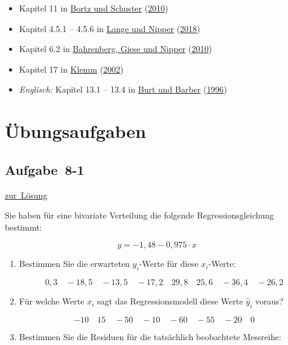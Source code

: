 \documentclass[
  11pt,
  ngerman,
  a4paper,
]{report}
\providecommand{\tightlist}{%
  \setlength{\itemsep}{0pt}\setlength{\parskip}{0pt}}
\begin{document}
\begin{itemize}
\tightlist
\item
  Kapitel 11 in \protect\hyperlink{ref-bortz}{Bortz und Schuster} (\protect\hyperlink{ref-bortz}{2010})
\item
  Kapitel 4.5.1 -- 4.5.6 in \protect\hyperlink{ref-delange}{Lange und Nipper} (\protect\hyperlink{ref-delange}{2018})
\item
  Kapitel 6.2 in \protect\hyperlink{ref-bahrenberg}{Bahrenberg, Giese und Nipper} (\protect\hyperlink{ref-bahrenberg}{2010})
\item
  Kapitel 17 in \protect\hyperlink{ref-klemm}{Klemm} (\protect\hyperlink{ref-klemm}{2002})
\item
  \emph{Englisch:} Kapitel 13.1 -- 13.4 in \protect\hyperlink{ref-burt}{Burt und Barber} (\protect\hyperlink{ref-burt}{1996})
\end{itemize}

\hypertarget{uxfcbungsaufgaben-7}{%
\section*{Übungsaufgaben}\label{uxfcbungsaufgaben-7}}

\hypertarget{aufgabe-8-1}{%
\subsection{Aufgabe~8-1}\label{aufgabe-8-1}}

\protect\hyperlink{loesung-8-1}{zur~Lösung}

Sie haben für eine bivariate Verteilung die folgende Regressionsgleichung bestimmt:

\[
y=-1{,}48-0{,}975\cdot x
\]

\begin{enumerate}
\def\labelenumi{\alph{enumi})}
\item
  Bestimmen Sie die erwarteten \(\hat{y}_i\)-Werte für diese \(x_i\)-Werte:

  \[
   0{,}3\quad-18{,}5\quad-13{,}5\quad-17{,}2\quad29{,}8\quad25{,}6\quad-36{,}4\quad-26{,}2
   \]
\item
  Für welche Werte \(x_i\) sagt das Regressionsmodell diese Werte \(\hat{y}_i\) voraus?

  \[
   -10\quad15\quad-50\quad-10\quad-60\quad-55\quad-20\quad0
   \]
\item
  Bestimmen Sie die Residuen für die tatsächlich beobachtete Messreihe:
\end{enumerate}
\end{document}
